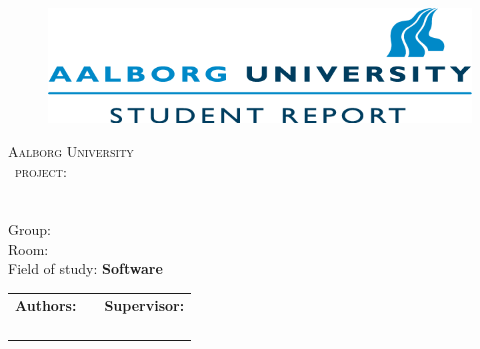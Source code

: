 \begin{titlepage}
	\begin{adjustwidth}{-1cm}{2cm}
	\begin{center}
		\begin{figure}
			\includegraphics{Pics/Logo.png}
		\end{figure}
		\vspace*{1.5cm}
		\textsc{\LARGE Aalborg University} \\[1.5cm]
		\textsc{\Large \SEMESTER\ project:} \\[0.5cm]
		\mbox{{\Huge \TITLE}}\\[.2cm]
		\mbox{{\Large \SUBJECT}}\\[2cm]
		Group: {\bf \GROUPNUMBER}\\
		Room: {\bf \GROUPROOM}\\[.5cm]
		Field of study: \textbf{Software}\\[1cm]
		\begin{tabular}{l l l}
			\textbf{Authors:}	&	\phantom{xxxxxxxxx}	&	\textbf{Supervisor:}\\
			\NAMEONE		&&	\SUPERVISOR\\
			\NAMETWO&\\			
			\NAMETHREE&\\
			\NAMEFOUR&\\
		\end{tabular}
	\vfill
	\ENDDATE
	\end{center}
	\end{adjustwidth}
\end{titlepage}